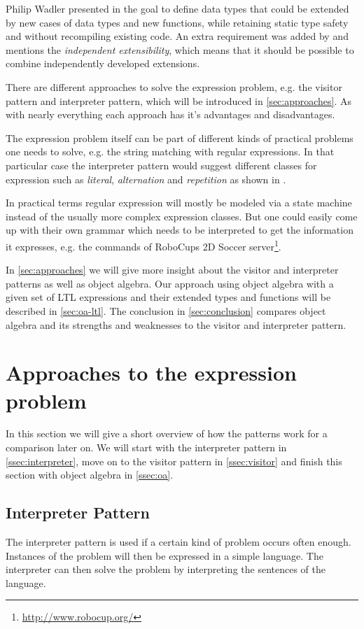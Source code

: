 \documentclass{llncs}
\begin{document}
Philip Wadler presented in \cite{wadler98} the goal to define data types that could be extended by new cases of data types and new functions, while retaining static type safety and without recompiling existing code. An extra requirement was added by \cite{Odersky05} and mentions the \emph{independent extensibility}, which means that it should be possible to combine independently developed extensions.

There are different approaches to solve the expression problem, e.g. the visitor pattern and interpreter pattern, which will be introduced in \autoref{sec:approaches}. As with nearly everything each approach has it's advantages and disadvantages. 

The expression problem itself can be part of different kinds of practical problems one needs to solve, e.g. the string matching with regular expressions. In that particular case the interpreter pattern would suggest different classes for expression such as \emph{literal}, \emph{alternation} and \emph{repetition} as shown in \cite{GHJV94}.

In practical terms regular expression will mostly be modeled via a state machine instead of the usually more complex expression classes. But one could easily come up with their own grammar which needs to be interpreted to get the information it expresses, e.g. the commands of RoboCups 2D Soccer server\footnote{\href{http://www.robocup.org/}{http://www.robocup.org/}}.

In \autoref{sec:approaches} we will give more insight about the visitor and interpreter patterns as well as object algebra. Our approach using object algebra with a given set of LTL expressions and their extended types and functions will be described in \autoref{sec:oa-ltl}. The conclusion in \autoref{sec:conclusion} compares object algebra and its strengths and weaknesses to the visitor and interpreter pattern.

\section{Approaches to the expression problem} \label{sec:approaches}
In this section we will give a short overview of how the patterns work for a comparison later on. We will start with the interpreter pattern in \autoref{ssec:interpreter}, move on to the visitor pattern in \autoref{ssec:visitor} and finish this section with object algebra in \autoref{ssec:oa}.

\subsection{Interpreter Pattern} \label{ssec:interpreter}
The interpreter pattern is used if a certain kind of problem occurs often enough. Instances of the problem will then be expressed in a simple language. The interpreter can then solve the problem by interpreting the sentences of the language.
\end{document}
